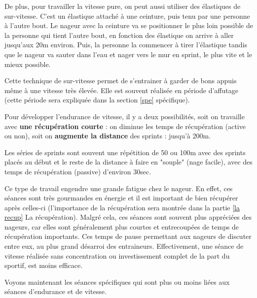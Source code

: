 \vspace{12pt}

De plus, pour travailler la vitesse pure, on peut aussi utiliser des élastiques de sur-vitesse. C'est un élastique attaché à une ceinture, puis tenu par une personne à l'autre bout. Le nageur avec la ceinture va se positionner le plus loin possible de la personne qui tient l'autre bout, en fonction des élastique on arrive à aller jusqu'aux 20m environ. Puis, la personne la commencer à tirer l'élastique tandis que le nageur va sauter dans l'eau et nager vers le mur en sprint, le plus vite et le mieux possible.

Cette technique de sur-vitesse permet de s'entrainer à garder de bons appuis même à une vitesse très élevée. Elle est souvent réalisée en période d'affutage (cette période sera expliquée dans la section \ref{spe} spécifique).

\vspace{12pt}

Pour développer l'endurance de vitesse, il y a deux possibilités, soit on travaille avec \textbf{une récupération courte} : on diminue les temps de récupération (active ou non), soit on \textbf{augmente la distance} des sprints : jusqu'à 200m.

\vspace{12pt}

Les séries de sprints sont souvent une répétition de 50 ou 100m avec des sprints placés au début et le reste de la distance à faire en "souple" (nage facile), avec des temps de récupération (passive) d'environ 30sec.

\vspace{12pt}

Ce type de travail engendre une grande fatigue chez le nageur. En effet, ces séances sont très gourmandes en énergie et il est important de bien récupérer après celles-ci (l'importance de la récupération sera montrée dans la partie \ref{la recup} La récupération).
Malgré cela, ces séances sont souvent plus appréciées des nageurs, car elles sont généralement plus courtes et entrecoupées de temps de récupération importants. Ces temps de pause permettant aux nageurs de discuter entre eux, au plus grand désarroi des entraineurs. Effectivement, une séance de vitesse réalisée sans concentration ou investissement complet de la part du sportif, est moins efficace.

Voyons maintenant les séances spécifiques qui sont plus ou moins liées aux séances d'endurance et de vitesse.


